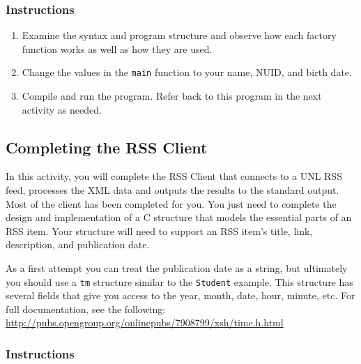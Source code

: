 \documentclass[12pt]{scrartcl}
\begin{document}
\subsubsection*{Instructions}

\begin{enumerate}
  \item Examine the syntax and program structure and observe how 
	each factory function works as well as how they are used.
  \item Change the values in the \texttt{main} function to your 
	name, NUID, and birth date.
  \item Compile and run the program.  Refer back to this program in 
	the next activity as needed.
\end{enumerate}
	
\subsection{Completing the RSS Client}

In this activity, you will complete the RSS Client that connects to a UNL 
RSS feed, processes the XML data and outputs the results to the 
standard output.  Most of the client has been completed for you.  
You just need to complete the design and implementation of a C 
structure that models the essential parts of an RSS item.  Your 
structure will need to support an RSS item's title, link, description, 
and publication date.  

As a first attempt you can treat the publication date as a string, 
but ultimately you should use a \texttt{tm} structure similar 
to the \texttt{Student} example.  This structure has several 
fields that give you access to the year, month, date, hour, minute, 
etc.  For full documentation, see the following: \url{http://pubs.opengroup.org/onlinepubs/7908799/xsh/time.h.html}

\subsubsection*{Instructions}
\end{document}
